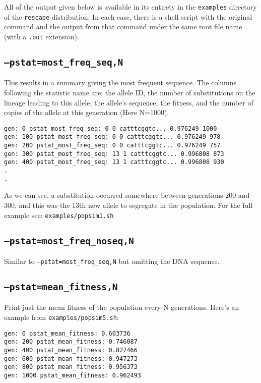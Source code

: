 \documentclass[11pt]{article}
\begin{document}
All of the output given below is available in its entirety in the \texttt{examples} directory of the \texttt{rescape} distribution. In each case, there is a shell script with the original command and the output from that command under the same root file name (with a \texttt{.out} extension).

\subsection{\texttt{--pstat=most\_freq\_seq,N}}

This results in a summary giving the most frequent sequence. The columns following the statistic name are: the allele ID, the number of substitutions on the lineage leading to this allele, the allele's sequence, the fitness, and the number of copies of the allele at this generation (Here N=1000).

\begin{verbatim}
gen: 0 pstat_most_freq_seq: 0 0 catttcggtc... 0.976249 1000
gen: 100 pstat_most_freq_seq: 0 0 catttcggtc... 0.976249 978
gen: 200 pstat_most_freq_seq: 0 0 catttcggtc... 0.976249 757
gen: 300 pstat_most_freq_seq: 13 1 catttcggtc... 0.996808 873
gen: 400 pstat_most_freq_seq: 13 1 catttcggtc... 0.996808 930
.
.
\end{verbatim}

As we can see, a substitution occurred somewhere between generations 200 and 300, and this was the 13th new allele to segregate in the population. For the full example see: \texttt{examples/popsim1.sh}

\subsection{\texttt{--pstat=most\_freq\_noseq,N}}

Similar to \texttt{--pstat=most\_freq\_seq,N} but omitting the DNA sequence.

\subsection{\texttt{--pstat=mean\_fitness,N}}
Print just the mean fitness of the population every N generations. Here's an example from \texttt{examples/popsim5.sh}:

\begin{verbatim}
gen: 0 pstat_mean_fitness: 0.603736
gen: 200 pstat_mean_fitness: 0.746087
gen: 400 pstat_mean_fitness: 0.827466
gen: 600 pstat_mean_fitness: 0.947273
gen: 800 pstat_mean_fitness: 0.956373
gen: 1000 pstat_mean_fitness: 0.962493
\end{verbatim}
\end{document}
